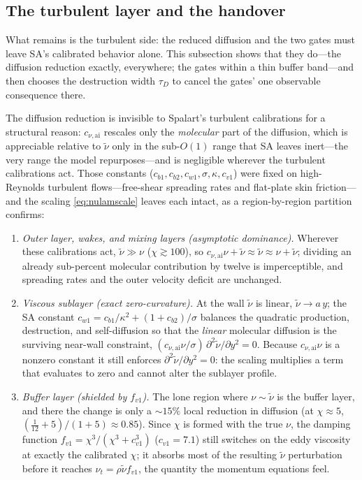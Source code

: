 \documentclass[journal]{new-aiaa}
\begin{document}
\subsection{The turbulent layer and the handover}\label{sec:calib_diff}


What remains is the turbulent side: the reduced diffusion and the two gates
must leave SA's calibrated behavior alone. This subsection shows that they
do---the diffusion reduction exactly, everywhere; the gates within a thin
buffer band---and then chooses the destruction width $\tau_D$ to cancel the
gates' one observable consequence there.

The diffusion reduction is invisible to Spalart's turbulent calibrations for
a structural reason: $c_{\nu,\mathrm{ai}}$ rescales
only the \emph{molecular} part of the diffusion, which is appreciable relative to
$\tilde\nu$ only in the sub-$O(1)$ range that SA leaves inert---the very range the
model repurposes---and is negligible wherever the turbulent calibrations act.
Those constants ($c_{b1},c_{b2},c_{w1},\sigma,\kappa,c_{v1}$) were fixed on
high-Reynolds turbulent flows---free-shear spreading rates and flat-plate skin
friction---and the scaling \eqref{eq:nulamscale} leaves each intact, as a
region-by-region partition confirms:
\begin{enumerate}
  \item \emph{Outer layer, wakes, and mixing layers (asymptotic dominance).}
  Wherever these calibrations act, $\tilde\nu\!\gg\!\nu$ ($\chi\!\gtrsim\!100$),
  so $c_{\nu,\mathrm{ai}}\nu+\tilde\nu\!\approx\!\tilde\nu\!\approx\!\nu+\tilde
  \nu$; dividing an already sub-percent molecular contribution by twelve is
  imperceptible, and spreading rates and the outer velocity deficit are
  unchanged.
  \item \emph{Viscous sublayer (exact zero-curvature).} At the wall $\tilde\nu$
  is linear, $\tilde\nu\!\to\!a\,y$; the SA constant
  $c_{w1}\!=\!c_{b1}/\kappa^2+(1+c_{b2})/\sigma$ balances the quadratic
  production, destruction, and self-diffusion so that the \emph{linear} molecular
  diffusion is the surviving near-wall constraint,
  $(c_{\nu,\mathrm{ai}}\nu/\sigma)\,\partial^2\tilde\nu/\partial y^2\!=\!0$.
  Because $c_{\nu,\mathrm{ai}}\nu$ is a nonzero constant it still enforces
  $\partial^2\tilde\nu/\partial y^2\!=\!0$: the scaling multiplies a term that
  evaluates to zero and cannot alter the sublayer profile.
  \item \emph{Buffer layer (shielded by $f_{v1}$).} The lone region where
  $\nu\!\sim\!\tilde\nu$ is the buffer layer, and there the change is only a
  $\sim\!15\%$ local reduction in diffusion (at $\chi\!\approx\!5$,
  $(\tfrac{1}{12}+5)/(1+5)\!\approx\!0.85$). Since $\chi$ is formed with the true
  $\nu$, the damping function $f_{v1}\!=\!\chi^3/(\chi^3+c_{v1}^3)$
  ($c_{v1}\!=\!7.1$) still switches on the eddy viscosity at exactly the
  calibrated $\chi$; it absorbs most of the resulting $\tilde\nu$ perturbation
  before it reaches $\nu_t\!=\!\rho\tilde\nu f_{v1}$, the quantity the momentum
  equations feel.
\end{enumerate}
\end{document}
